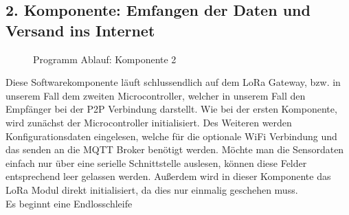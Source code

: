 \newpage

\subsection{2. Komponente: Emfangen der Daten und Versand ins Internet} \label{Empfänger}

\begin{center}
	\begin{figure}[h]
	 
	 \noindent{}
	 \caption[PAP komponente 2]{Programm Ablauf: Komponente 2}
	 \label{fig:lorareadwifisend}
	\end{figure}
\end{center}

Diese Softwarekomponente läuft schlussendlich auf dem LoRa Gateway, bzw. in unserem Fall dem zweiten Microcontroller, welcher in unserem Fall den Empfänger bei der P2P Verbindung darstellt.
Wie bei der ersten Komponente, wird zunächst der Microcontroller initialisiert. Des Weiteren werden Konfigurationsdaten eingelesen, welche für die optionale WiFi Verbindung und das senden an die MQTT Broker benötigt werden. Möchte man die Sensordaten einfach nur über eine serielle Schnittstelle auslesen, können diese Felder entsprechend leer gelassen werden.
Außerdem wird in dieser Komponente das LoRa Modul direkt initialisiert, da dies nur einmalig geschehen muss.\\
Es beginnt eine Endlosschleife

